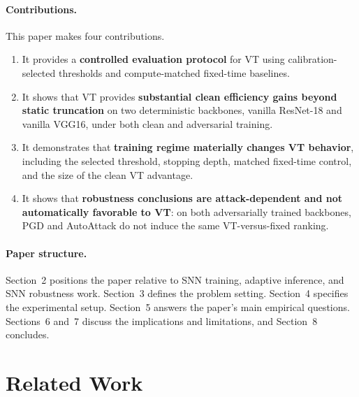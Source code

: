 \documentclass[11pt]{article}
\begin{document}
\paragraph{Contributions.} This paper makes four contributions.
\begin{enumerate}[leftmargin=1.3em]
\item It provides a \textbf{controlled evaluation protocol} for VT using calibration-selected thresholds and compute-matched fixed-time baselines.
\item It shows that VT provides \textbf{substantial clean efficiency gains beyond static truncation} on two deterministic backbones, vanilla ResNet-18 and vanilla VGG16, under both clean and adversarial training.
\item It demonstrates that \textbf{training regime materially changes VT behavior}, including the selected threshold, stopping depth, matched fixed-time control, and the size of the clean VT advantage.
\item It shows that \textbf{robustness conclusions are attack-dependent and not automatically favorable to VT}: on both adversarially trained backbones, PGD and AutoAttack do not induce the same VT-versus-fixed ranking.
\end{enumerate}

\paragraph{Paper structure.} Section~2 positions the paper relative to SNN training, adaptive inference, and SNN robustness work. Section~3 defines the problem setting. Section~4 specifies the experimental setup. Section~5 answers the paper's main empirical questions. Sections~6 and~7 discuss the implications and limitations, and Section~8 concludes.

\section{Related Work}
\end{document}
